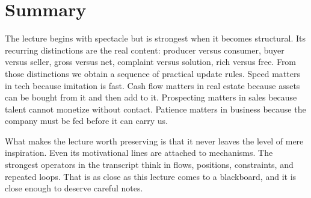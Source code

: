 \section{Summary}

The lecture begins with spectacle but is strongest when it becomes structural. Its recurring distinctions are the real content: producer versus consumer, buyer versus seller, gross versus net, complaint versus solution, rich versus free. From those distinctions we obtain a sequence of practical update rules. Speed matters in tech because imitation is fast. Cash flow matters in real estate because assets can be bought from it and then add to it. Prospecting matters in sales because talent cannot monetize without contact. Patience matters in business because the company must be fed before it can carry us.

What makes the lecture worth preserving is that it never leaves the level of mere inspiration. Even its motivational lines are attached to mechanisms. The strongest operators in the transcript think in flows, positions, constraints, and repeated loops. That is as close as this lecture comes to a blackboard, and it is close enough to deserve careful notes.